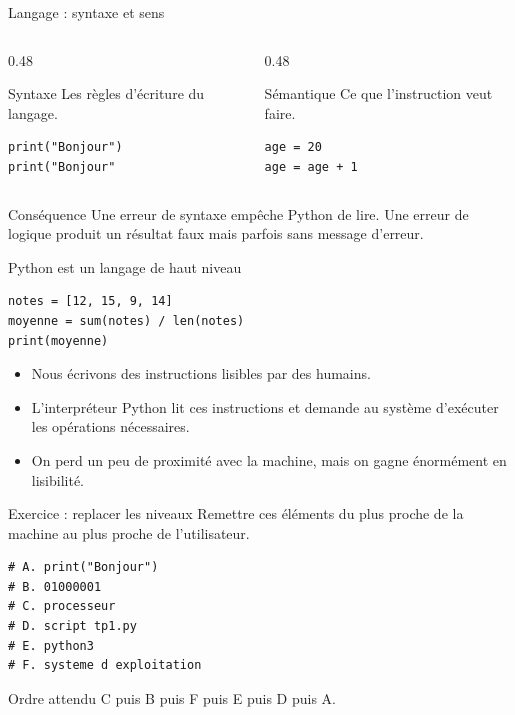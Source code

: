 \documentclass[10pt,aspectratio=169]{beamer}
\begin{document}
\begin{frame}[fragile]{Langage : syntaxe et sens}
\begin{columns}[T,totalwidth=\textwidth]
\begin{column}{0.48\textwidth}
\begin{block}{Syntaxe}
Les règles d’écriture du langage.
\end{block}
\begin{lstlisting}
print("Bonjour")
print("Bonjour"
\end{lstlisting}
\end{column}
\begin{column}{0.48\textwidth}
\begin{block}{Sémantique}
Ce que l’instruction veut faire.
\end{block}
\begin{lstlisting}
age = 20
age = age + 1
\end{lstlisting}
\end{column}
\end{columns}
\vspace{0.35cm}
\begin{block}{Conséquence}
Une erreur de syntaxe empêche Python de lire. Une erreur de logique produit un résultat faux mais parfois sans message d’erreur.
\end{block}
\end{frame}

\begin{frame}[fragile]{Python est un langage de haut niveau}
\begin{lstlisting}
notes = [12, 15, 9, 14]
moyenne = sum(notes) / len(notes)
print(moyenne)
\end{lstlisting}
\begin{itemize}
  \item Nous écrivons des instructions lisibles par des humains.
  \item L’interpréteur Python lit ces instructions et demande au système d’exécuter les opérations nécessaires.
  \item On perd un peu de proximité avec la machine, mais on gagne énormément en lisibilité.
\end{itemize}
\end{frame}

\begin{frame}[fragile]{Exercice : replacer les niveaux}
Remettre ces éléments du plus proche de la machine au plus proche de l’utilisateur.
\begin{lstlisting}
# A. print("Bonjour")
# B. 01000001
# C. processeur
# D. script tp1.py
# E. python3
# F. systeme d exploitation
\end{lstlisting}
\pause
\begin{block}{Ordre attendu}
C puis B puis F puis E puis D puis A.
\end{block}
\end{frame}
\end{document}
